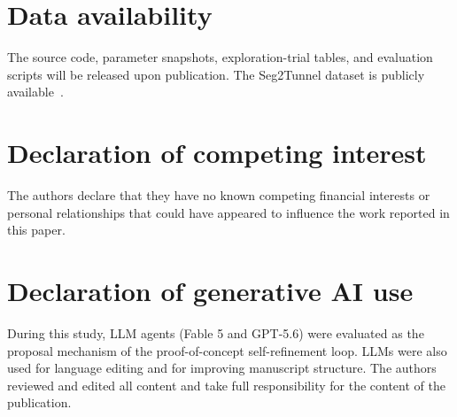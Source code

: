 \documentclass[a4paper,fleqn]{cas-dc}
\begin{document}

\section*{Data availability}

The source code, parameter snapshots, exploration-trial tables, and evaluation scripts will be released upon publication. The Seg2Tunnel dataset is publicly available~\cite{lin2024seg2tunnel}.

\section*{Declaration of competing interest}

The authors declare that they have no known competing financial interests or personal relationships that could have appeared to influence the work reported in this paper.

\section*{Declaration of generative AI use}

During this study, LLM agents (Fable 5 and GPT-5.6) were evaluated as the proposal mechanism of the proof-of-concept self-refinement loop. LLMs were also used for language editing and for improving manuscript structure. The authors reviewed and edited all content and take full responsibility for the content of the publication.





\end{document}
